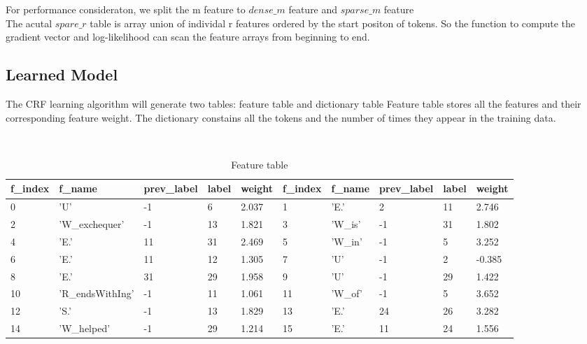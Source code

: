 For performance consideraton, we split the m feature to $dense\_m$ feature and $sparse\_m$ feature\\
The acutal $spare\_r$ table is array union of individal r features ordered by the start positon of tokens.
So the function to compute the gradient vector and log-likelihood can scan the feature arrays from beginning to end.

\subsection{Learned Model}
The CRF learning algorithm will generate two tables: feature table and dictionary table
Feature table stores all the features and their corresponding feature weight.
The dictionary constains all the tokens and the number of times they appear in the training data.\\
\begin {table}[h]
\caption {Feature table} \label{tab:featuretbl}
\begin{center}
    \scriptsize\tt
    \begin{tabular}{ | l | l | l | l | l || l | l | l | l | l | }
    \hline
    f\_index & f\_name & prev\_label & label & weight & f\_index & f\_name & prev\_label & label & weight\\
    \hline
    0&'U'&-1&6&2.037& 1&'E.'&2&11&2.746   \\
    2&'W\_exchequer'&-1&13&1.821& 3&'W\_is'&-1&31&1.802 \\
    4&'E.'&11&31&2.469& 5&'W\_in'&-1&5&3.252 \\
    6&'E.'&11&12&1.305& 7&'U'&-1&2&-0.385 \\
    8&'E.'&31&29&1.958& 9&'U'&-1&29&1.422 \\
    10&'R\_endsWithIng'&-1&11&1.061&11&'W\_of'&-1&5&3.652 \\
    12&'S.'&-1&13&1.829& 13&'E.'&24&26&3.282 \\
    14&'W\_helped'&-1&29&1.214& 15&'E.'&11&24&1.556 \\
    \hline
    \end{tabular}
\end{center}
\end {table}


